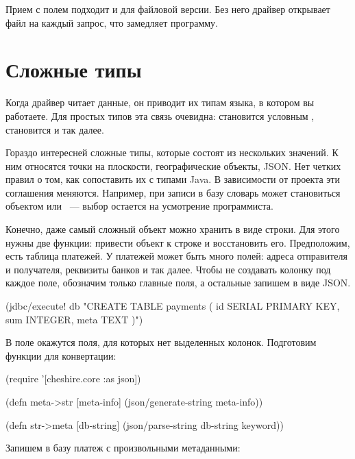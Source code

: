 Прием с полем  подходит и для файловой версии. Без него драйвер открывает файл на каждый запрос, что замедляет программу.

\section{Сложные типы}

Когда драйвер читает данные, он приводит их типам языка, в котором вы работаете. Для простых типов эта связь очевидна:  становится условным ,  становится  и так далее.

Гораздо интересней сложные типы, которые состоят из нескольких значений. К ним относятся точки на плоскости, географические объекты, JSON. Нет четких правил о том, как сопоставить их с типами Java. В зависимости от проекта эти соглашения меняются. Например, при записи в базу словарь может становиться объектом  или ~--- выбор остается на усмотрение программиста.

Конечно, даже самый сложный объект можно хранить в виде строки. Для этого нужны две функции: привести объект к строке и восстановить его. Предположим, есть таблица платежей. У платежей может быть много полей: адреса отправителя и получателя, реквизиты банков и так далее. Чтобы не создавать колонку под каждое поле, обозначим только главные поля, а остальные запишем в виде JSON.

\begin{english}
  \begin{clojure}
(jdbc/execute! db "CREATE TABLE payments (
  id SERIAL PRIMARY KEY,
  sum INTEGER,
  meta TEXT
)")
  \end{clojure}
\end{english}

В поле  окажутся поля, для которых нет выделенных колонок. Подготовим функции для конвертации:

\begin{english}
  \begin{clojure}
(require '[cheshire.core :as json])

(defn meta->str
  [meta-info]
  (json/generate-string meta-info))

(defn str->meta
  [db-string]
  (json/parse-string db-string keyword))
  \end{clojure}
\end{english}

Запишем в базу платеж с произвольными метаданными:


